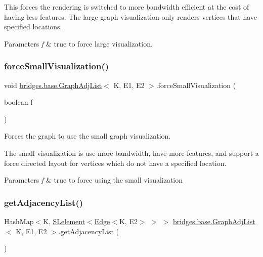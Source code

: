 This forces the rendering is switched to more bandwidth efficient at the cost of having less features. The large graph visualization only renders vertices that have specified locations.


\begin{DoxyParams}{Parameters}
{\em f} & true to force large visualization. \\
\hline
\end{DoxyParams}
\mbox{\label{classbridges_1_1base_1_1_graph_adj_list_ae14e51214742db0c4dab26c1d409f4ed}} 
\subsubsection{\texorpdfstring{force\+Small\+Visualization()}{forceSmallVisualization()}}
{\footnotesize\ttfamily void \hyperlink{classbridges_1_1base_1_1_graph_adj_list}{bridges.\+base.\+Graph\+Adj\+List}$<$ K, E1, E2 $>$.force\+Small\+Visualization (\begin{DoxyParamCaption}\item[{boolean}]{f }\end{DoxyParamCaption})}



Forces the graph to use the small graph visualization. 

The small visualization is use more bandwidth, have more features, and support a force directed layout for vertices which do not have a specified location.


\begin{DoxyParams}{Parameters}
{\em f} & true to force using the small visualization \\
\hline
\end{DoxyParams}
\mbox{\label{classbridges_1_1base_1_1_graph_adj_list_a77771e356aa8bf44525be9ae01603989}} 
\subsubsection{\texorpdfstring{get\+Adjacency\+List()}{getAdjacencyList()}\hspace{0.1cm}{\footnotesize\ttfamily [1/2]}}
{\footnotesize\ttfamily Hash\+Map$<$K, \hyperlink{classbridges_1_1base_1_1_s_lelement}{S\+Lelement}$<$\hyperlink{classbridges_1_1base_1_1_edge}{Edge}$<$K, E2$>$ $>$ $>$ \hyperlink{classbridges_1_1base_1_1_graph_adj_list}{bridges.\+base.\+Graph\+Adj\+List}$<$ K, E1, E2 $>$.get\+Adjacency\+List (\begin{DoxyParamCaption}{ }\end{DoxyParamCaption})}



